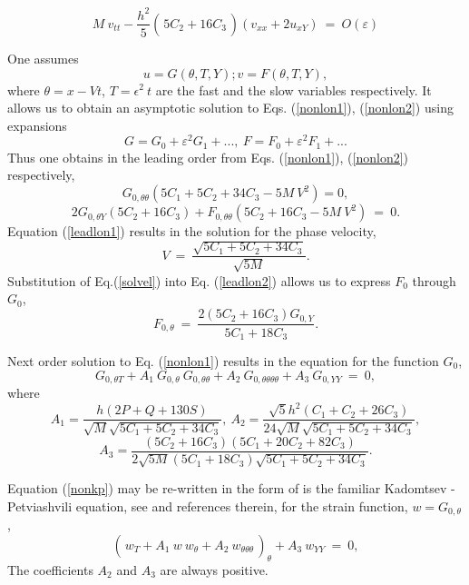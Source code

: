 \begin{equation}
	M~v_{tt}-\frac{h^2}{5}\left(\frac{}{}5C_2+16 C_3\frac{}{}\right) (v_{xx}+2u_{xY})~=~O(\varepsilon)
	\label{nonlon2}
\end{equation}

One assumes
\[
u= G\left(\theta, T ,Y\right); v= F\left(\theta, T, Y\right),
\]
where $\theta = x- V t$, $T= \epsilon ^2~t$ are the fast and the slow variables respectively. It allows us to obtain an asymptotic solution to Eqs. (\ref{nonlon1}), (\ref{nonlon2}) using expansions
\[
G = G_0 + \varepsilon^2 G_1+...,~F = F_0+\varepsilon^2 F_1+...
\]
Thus one obtains in the leading order from Eqs. (\ref{nonlon1}), (\ref{nonlon2}) respectively,
\begin{equation}
	G_{0,\theta \theta} \left(5 C_1+ 5 C_2 + 34 C_3-5 M~ V^2\right)=0,\label{leadlon1}
\end{equation}
\begin{equation}
	2 G_{0,\theta Y} (5 C_2 + 16 C_3) + F_{0,\theta \theta} (5 C_2 + 16 C_3 - 5 M~ V^2)~=~0. \label{leadlon2}
\end{equation}
Equation (\ref{leadlon1}) results in the solution for the phase velocity,
\begin{equation}
	V~=~ \frac{\sqrt{5 C_1 + 5 C_2 + 34 C_3}}{\sqrt{5M}}. \label{solvel}
\end{equation}
Substitution of Eq.(\ref{solvel}) into Eq. (\ref{leadlon2}) allows us to express $F_0$ through $G_0$,
\begin{equation}
	F_{0,\theta}~=~\frac{2 (5 C_2+16 C_3) G_{0,Y}}{5 C_1 +18 C_3}. \label{rel}
\end{equation}

Next order solution to Eq. (\ref{nonlon1}) results in the equation for the function $G_0$,
\begin{equation}
	G_{0,\theta T}+ A_1~ G_{0,\theta}~ G_{0,\theta \theta} +A_2 ~G_{0,\theta \theta \theta \theta}+ A_3~ G_{0,Y Y}~=~0, \label{nonkp}
\end{equation}
where
\[
A_1=\frac{h \left(2 P+ Q + 130 S\right)}{ \sqrt{M} \sqrt{5 C_1 + 5 C_2 + 34 C_3}}, ~A_2 = \frac{\sqrt{5} h^2 (C_1 + C_2+26 C_3)}{24 \sqrt{M} \sqrt{5 C_1+5 C_2 + 34 C_3}},
\]
\[
A_3 = \frac{(5 C_2 + 16 C_3) (5 C_1 + 20 C_2+ 82 C_3)}{2  \sqrt{5M} (5 C_1+18 C_3 ) \sqrt{5 C_1 + 5 C_2 + 34 C_3}}.
\]


Equation (\ref{nonkp}) may be re-written in the form of is the familiar Kadomtsev - Petviashvili equation, see \cite{Ablowitz} and references therein,  for the strain function, $w=G_{0,\theta}$,
\begin{equation}
	\left(\frac{}{} w_{ T}+ A_1~ w~ w_{ \theta} +A_2 ~w_{\theta \theta \theta} \frac{}{}\right)_\theta+ A_3~ w_{Y Y}~=~0, \label{kp}
\end{equation}
The coefficients $A_2$ and $A_3$ are always positive.


